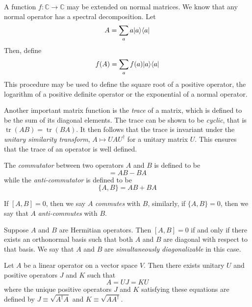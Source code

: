 A function $f:\mathbb{C}\to\mathbb{C}$ may be extended on normal matrices. We know that any normal operator has a spectral decomposition. Let 
\begin{equation*}
    A = \sum_a a|a\rangle\langle a|
\end{equation*}
Then, define 
\begin{equation*}
    f(A) = \sum_a f(a)|a\rangle\langle a|
\end{equation*}
This procedure may be used to define the square root of a positive operator, the logarithm of a positive definite operator or the exponential of a normal operator.

Another important matrix function is the \textit{trace} of a matrix, which is defined to be the sum of its diagonal elements. The trace can be shown to be \textit{cyclic}, that is $\operatorname{tr}(AB) = \operatorname{tr}(BA)$. It then follows that the trace is invariant under the \textit{unitary similarity transform}, $A\mapsto UAU^\dagger$ for a unitary matrix $U$. This ensures that the trace of an operator is well defined.

The \textit{commutator} between two operators $A$ and $B$ is defined to be 
\begin{equation*}
    [A, B] = AB - BA
\end{equation*}
while the \textit{anti-commutator} is defined to be 
\begin{equation*}
    \{A, B\} = AB + BA
\end{equation*}

If $[A,B] = 0$, then we say $A$ \textit{commutes} with $B$, similarly, if $\{A, B\} = 0$, then we say that $A$ \textit{anti-commutes} with $B$.

\begin{theorem}
    Suppose $A$ and $B$ are Hermitian operators. Then $[A,B] = 0$ if and only if there exists an orthonormal basis such that both $A$ and $B$ are diagonal with respect to that basis. We say that $A$ and $B$ are \textit{simultaneously diagonalizable} in this case.
\end{theorem}

\begin{theorem}
    Let $A$ be a linear operator on a vector space $V$. Then there exists unitary $U$ and positive operators $J$ and $K$ such that 
    \begin{equation*}
        A = UJ = KU
    \end{equation*}
    where the unique positive operators $J$ and $K$ satisfying these equations are defined by $J \equiv\sqrt{A^\dagger A}$ and $K\equiv\sqrt{AA^\dagger}$.
\end{theorem}

